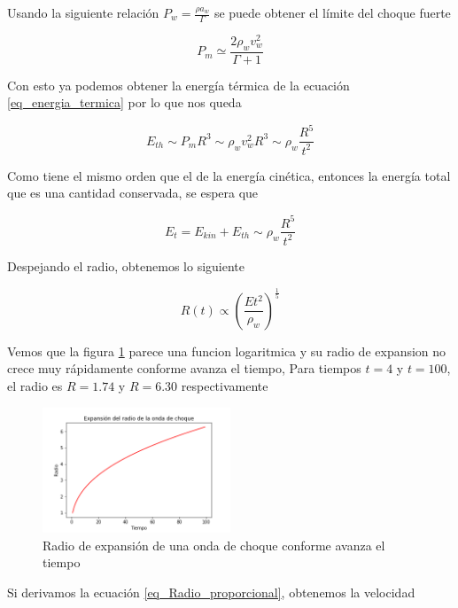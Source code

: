 \documentclass[12pt,a4paper]{book}
\begin{document}
Usando la siguiente relación $ P_w = \frac{\rho a_w }{\Gamma}$ se puede obtener el límite del choque fuerte

\begin{equation}
  P_m  \simeq \frac{2 \rho_w v_w^2}{\Gamma + 1}
\end{equation}

Con esto ya podemos obtener la energía térmica de la ecuación \ref{eq_energia_termica} por lo que nos queda 

\begin{equation}
  E_{th} \sim P_m R^3 \sim \rho_w v_w^2 R^3 \sim \rho_w \frac{R^5}{t^2}
\end{equation}

Como tiene el mismo orden que el de la energía cinética, entonces la energía total que es una cantidad conservada, se espera que

\begin{equation}
  E_t = E_{kin} + E_{th} \sim \rho_w \frac{R^5}{t^2}
\end{equation}

Despejando el radio, obtenemos lo siguiente

\begin{equation} \label{eq_Radio_proporcional}
  R(t) \varpropto \left(\frac{E t^2}{\rho_w}\right)^{\frac{1}{5}}
\end{equation}

Vemos que la figura \ref{fig_Radio_v_tiempo} parece una funcion logaritmica y su radio de expansion no crece muy rápidamente conforme avanza el tiempo,
Para tiempos $t = 4$ y $t = 100$, el radio es $R = 1.74$ y $R = 6.30$ respectivamente

\begin{figure}
  \centering
    \includegraphics[width=0.5\textwidth]{Figuras/Teoria/Radio_vs_tiempo.png}
  \caption{Radio de expansión de una onda de choque conforme avanza el tiempo } \label{fig_Radio_v_tiempo}
\end{figure}

Si derivamos la ecuación \ref{eq_Radio_proporcional}, obtenemos la velocidad
\end{document}
